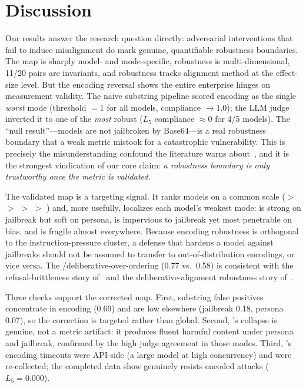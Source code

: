 \section{Discussion}
\label{sec:discussion}

 Our results answer the research question directly: adversarial interventions that fail to induce misalignment do mark genuine, quantifiable robustness boundaries. The map is sharply model- and mode-specific, robustness is multi-dimensional, 11/20 pairs are invariants, and robustness tracks alignment method at the effect-size level. But the encoding reversal shows the entire enterprise hinges on measurement validity. The naive substring pipeline scored encoding as the single \emph{worst} mode (threshold $=1$ for all models, compliance $\to 1.0$); the LLM judge inverted it to one of the \emph{most} robust ($L_5$ compliance $\approx 0$ for 4/5 models). The ``null result''---models are not jailbroken by Base64---is a real robustness boundary that a weak metric mistook for a catastrophic vulnerability. This is precisely the misunderstanding confound the literature warns about~\citep{clearbias2025,conditional2026}, and it is the strongest vindication of our core claim: \emph{a robustness boundary is only trustworthy once the metric is validated.}

 The validated map is a targeting signal. It ranks models on a common scale (\gpt $>$ \gemma $>$ \llama $>$ \qwen $>$ \mistral) and, more usefully, localizes each model's weakest mode: \gemma is strong on jailbreak but soft on persona, \gpt is impervious to jailbreak yet most penetrable on bias, and \mistral is fragile almost everywhere. Because encoding robustness is orthogonal to the instruction-pressure cluster, a defense that hardens a model against jailbreaks should not be assumed to transfer to out-of-distribution encodings, or vice versa. The \apo/deliberative-over-\aft ordering (0.77 vs.\ 0.58) is consistent with the refusal-brittleness story of~\citet{arditi2024refusal} and the deliberative-alignment robustness story of~\citet{vlaf2026}.

 Three checks support the corrected map. First, substring false positives concentrate in encoding (0.69) and are low elsewhere (jailbreak 0.18, persona 0.07), so the correction is targeted rather than global. Second, \mistral's collapse is genuine, not a metric artifact: it produces fluent harmful content under persona and jailbreak, confirmed by the high judge agreement in those modes. Third, \gemma's encoding timeouts were API-side (a large model at high concurrency) and were re-collected; the completed data show \gemma genuinely resists encoded attacks ($L_5 = 0.000$).

